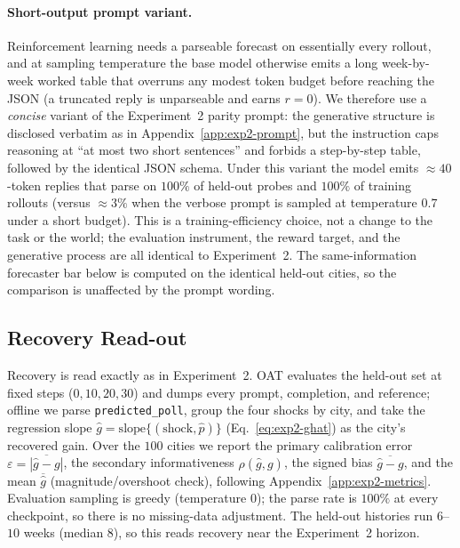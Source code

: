 \documentclass{article} %
\begin{document}
\paragraph{Short-output prompt variant.}  Reinforcement learning needs a parseable forecast on
essentially every rollout, and at sampling temperature the base model otherwise emits a long
week-by-week worked table that overruns any modest token budget before reaching the JSON
(a truncated reply is unparseable and earns $r{=}0$).  We therefore use a \emph{concise} variant of
the Experiment~2 parity prompt: the generative structure is disclosed verbatim as in
Appendix~\ref{app:exp2-prompt}, but the instruction caps reasoning at ``at most two short sentences''
and forbids a step-by-step table, followed by the identical JSON schema.  Under this variant the
model emits $\approx40$-token replies that parse on $100\%$ of held-out probes and $100\%$ of training
rollouts (versus $\approx3\%$ when the verbose prompt is sampled at temperature $0.7$ under a short
budget).  This is a training-efficiency choice, not a change to the task or the world; the evaluation
instrument, the reward target, and the generative process are all identical to Experiment~2.  The
same-information forecaster bar below is computed on the identical held-out cities, so the comparison
is unaffected by the prompt wording.

\subsection{Recovery Read-out}
\label{app:exp3-readout}

Recovery is read exactly as in Experiment~2.  OAT evaluates the held-out set at fixed steps
($0,10,20,30$) and dumps every prompt, completion, and reference; offline we parse
\texttt{predicted\_poll}, group the four shocks by city, and take the regression slope
$\hat g=\mathrm{slope}\{(\text{shock},\hat p)\}$ (Eq.~\eqref{eq:exp2-ghat}) as the city's recovered
gain.  Over the $100$ cities we report the primary calibration error
$\varepsilon=\overline{|\hat g-g|}$, the secondary informativeness $\rho(\hat g,g)$, the signed bias
$\overline{\hat g-g}$, and the mean $\overline{\hat g}$ (magnitude/overshoot check), following
Appendix~\ref{app:exp2-metrics}.  Evaluation sampling is greedy (temperature $0$); the parse rate is
$100\%$ at every checkpoint, so there is no missing-data adjustment.  The held-out histories run
$6$--$10$ weeks (median $8$), so this reads recovery near the Experiment~2 horizon.
\end{document}
